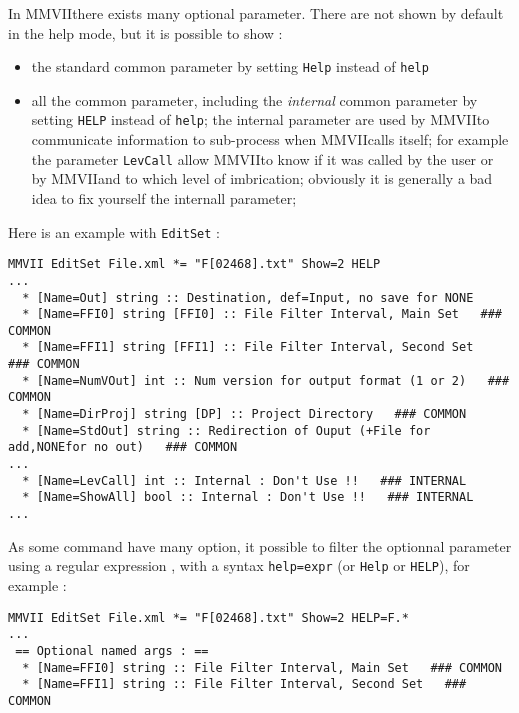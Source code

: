 \documentclass[a4paper]{book}
\newcommand{\PPP}{MMVII}
\begin{document}
{In \PPP there exists many optional parameter. There are not shown by default in the help mode,
but it is possible to show :

\begin{itemize}
   \item  the standard common parameter by setting {\tt Help} instead of {\tt help}

   \item  all the common parameter, including the \emph{internal} common parameter
          by setting {\tt HELP} instead of {\tt help}; the internal parameter are used
          by \PPP to communicate information to sub-process  when  \PPP  calls itself;
          for example the parameter {\tt LevCall} allow \PPP to know if it was called
          by the user or by \PPP and to which level of imbrication; obviously it is generally
          a bad idea to fix yourself the internall parameter;
\end{itemize}

Here is an example with {\tt EditSet} :

\begin{verbatim}
MMVII EditSet File.xml *= "F[02468].txt" Show=2 HELP
...
  * [Name=Out] string :: Destination, def=Input, no save for NONE
  * [Name=FFI0] string [FFI0] :: File Filter Interval, Main Set   ### COMMON 
  * [Name=FFI1] string [FFI1] :: File Filter Interval, Second Set   ### COMMON 
  * [Name=NumVOut] int :: Num version for output format (1 or 2)   ### COMMON 
  * [Name=DirProj] string [DP] :: Project Directory   ### COMMON 
  * [Name=StdOut] string :: Redirection of Ouput (+File for add,NONEfor no out)   ### COMMON 
...
  * [Name=LevCall] int :: Internal : Don't Use !!   ### INTERNAL 
  * [Name=ShowAll] bool :: Internal : Don't Use !!   ### INTERNAL 
...
\end{verbatim}

As some command have many option, it possible to filter the
optionnal parameter using a regular expression , with a
syntax {\tt help=expr} (or {\tt Help} or {\tt HELP}), for
example :


\begin{verbatim}
MMVII EditSet File.xml *= "F[02468].txt" Show=2 HELP=F.*
...
 == Optional named args : ==
  * [Name=FFI0] string :: File Filter Interval, Main Set   ### COMMON 
  * [Name=FFI1] string :: File Filter Interval, Second Set   ### COMMON 
\end{verbatim}



}
\end{document}
